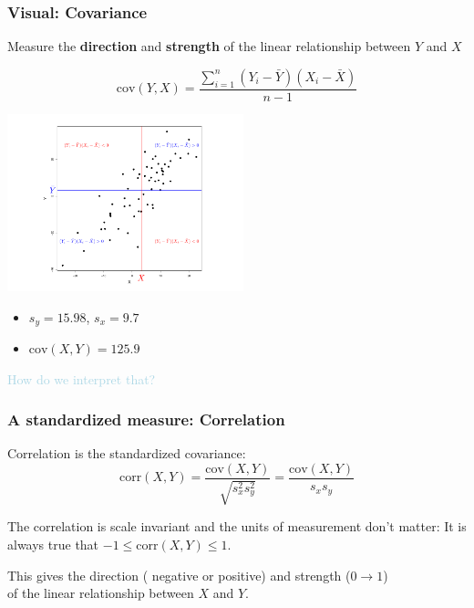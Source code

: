 \documentclass{beamer}
\newcommand{\bo}[1]{\textcolor{burntorange}{#1}}
\newcommand{\lb}[1]{\textcolor{lightblue}{#1}}
\newcommand{\bl}{\color{lightblue}}
\newcommand{\bk}{\color{black}}
\newcommand{\mr}[1]{\mathrm{#1}}
\newcommand{\sk}{\vspace{.5cm}}
\begin{document}
\begin{frame}
\frametitle{Visual: Covariance} 
{\scriptsize
Measure the {\color{burntorange} \bf direction} and {\color{burntorange} \bf strength} of the linear relationship between $Y$ and $X$ 

$$
\text{cov}(Y,X) = \frac{\sum_{i=1}^n{(Y_i - \bar{Y})(X_i - \bar{X})}}{n-1}
$$
}

\vspace{-0.5cm}

\hspace{-0.5cm}
\begin{minipage}{2.65in}
\includegraphics[width=2.7in]{figures/cor-pic.pdf}
\end{minipage}
\begin{minipage}{1.65in}
\begin{itemize}
\item $s_y   = 15.98$, $s_x = 9.7$
\item $\text{cov}(X,Y) = 125.9$
\end{itemize}

\vspace{3mm}
\hspace*{3.5mm} \small \lb{How do we interpret that?}
\end{minipage}


\end{frame}

\begin{frame}
\frametitle{A standardized measure: Correlation}

\bo{Correlation} is the standardized covariance: \sk
\[
\mr{corr}(X,Y) = \frac{\mr{cov}(X,Y)}{\sqrt{s^2_x s^2_y}} = \frac{\mr{cov}(X,Y)}{s_x s_y} 
\]

\sk
The correlation  is scale invariant and the units of measurement don't
matter: \bl
It is always true that $-1 \leq \mr{corr}(X,Y) \leq 1$. \bk

\sk
\sk
This gives the direction (\color{red} negative \bk or \color{green} positive\bk) and strength
($0\rightarrow 1$) \\of the \bl linear \bk relationship between $X$ and
$Y$.

\end{frame}
\end{document}
